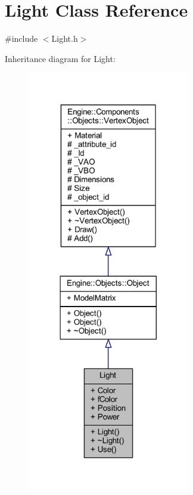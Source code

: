 \hypertarget{classLight}{}\section{Light Class Reference}
\label{classLight}


{\ttfamily \#include $<$Light.\+h$>$}



Inheritance diagram for Light\+:
\nopagebreak
\begin{figure}[H]
\begin{center}
\leavevmode
\includegraphics[width=201pt]{classLight__inherit__graph}
\end{center}
\end{figure}


